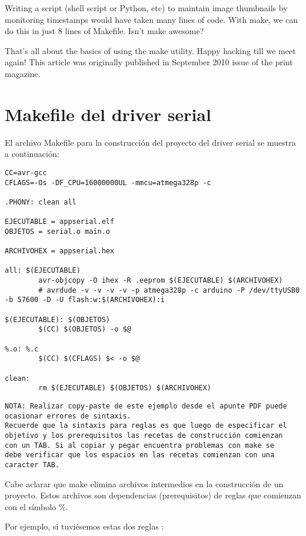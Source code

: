 \documentclass[output=paper, 
colorlinks,
citecolor=brown,
newtxmath
]{langscibook}
\begin{document}
Writing a script (shell script or Python, etc) to maintain image thumbnails by monitoring timestamps would have taken many lines of code. With make, we can do this in just 8 lines of Makefile. Isn’t make awesome?

That’s all about the basics of using the make utility. Happy hacking till we meet again!
This article was originally published in September 2010 issue of the print magazine.



\section {Makefile del driver serial}

El archivo Makefile para la construcción del proyecto del driver serial
se muestra a continuación:

\begin{verbatim}
CC=avr-gcc
CFLAGS=-Os -DF_CPU=16000000UL -mmcu=atmega328p -c

.PHONY: clean all

EJECUTABLE = appserial.elf
OBJETOS = serial.o main.o

ARCHIVOHEX = appserial.hex

all: $(EJECUTABLE)
        avr-objcopy -O ihex -R .eeprom $(EJECUTABLE) $(ARCHIVOHEX)
        # avrdude -v -v -v -v -p atmega328p -c arduino -P /dev/ttyUSB0 -b 57600 -D -U flash:w:$(ARCHIVOHEX):i

$(EJECUTABLE): $(OBJETOS)
        $(CC) $(OBJETOS) -o $@

%.o: %.c
        $(CC) $(CFLAGS) $< -o $@
	
clean:
        rm $(EJECUTABLE) $(OBJETOS) $(ARCHIVOHEX)
\end{verbatim}


\begin{verbatim}
NOTA: Realizar copy-paste de este ejemplo desde el apunte PDF puede 
ocasionar errores de sintaxis.
Recuerde que la sintaxis para reglas es que luego de especificar el 
objetivo y los prerequisitos las recetas de construcción comienzan 
con un TAB. Si al copiar y pegar encuentra problemas con make se 
debe verificar que los espacios en las recetas comienzan con una 
caracter TAB.
\end{verbatim}

Cabe aclarar que make elimina archivos intermedios en la construcción
de un proyecto. Estos archivos son dependencias (prerequisitos) de reglas que comienzan 
con el símbolo \%.

Por ejemplo, si tuviésemos estas dos reglas :
\end{document}

